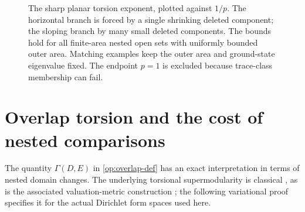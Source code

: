 \documentclass[11pt,reqno]{amsart}
\numberwithin{equation}{section}
\begin{document}
\begin{figure}[tb]
\centering
{}
\caption{The sharp planar torsion exponent, plotted against \(1/p\).
The horizontal branch is forced by a single shrinking deleted
component; the sloping branch by many small deleted components.
The bounds hold for all finite-area nested open sets with uniformly
bounded outer area.  Matching examples keep the outer area and
ground-state eigenvalue fixed.  The endpoint \(p=1\) is excluded
because trace-class membership can fail.}
\label{fig:sharp-exponent}
\end{figure}



\section{Overlap torsion and the cost of nested comparisons}
\label{op:overlap-paths}

The quantity $\Gamma(D,E)$ in \eqref{op:overlap-def} has an exact
interpretation in terms of nested domain changes.  The underlying
torsional supermodularity is classical
\cite{LuttingerFriedberg1976}, as is the associated
valuation-metric construction \cite{Leclerc2003}; the following
variational proof specifies it for the actual Dirichlet form spaces
used here.
\end{document}
